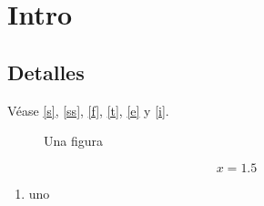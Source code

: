 \documentclass{article}
\begin{document}
\section{Intro}\label{s}
\subsection{Detalles}\label{ss}
Véase \autoref{s}, \autoref{ss}, \autoref{f}, \autoref{t}, \autoref{e} y \autoref{i}.
\begin{figure}[h]
\caption{Una figura}\label{f}
\end{figure}
\begin{table}[h]
\caption{Una tabla}\label{t}
\end{table}
\begin{equation}x = 1.5\label{e}\end{equation}
\begin{enumerate}
\item uno\label{i}
\end{enumerate}
\end{document}
